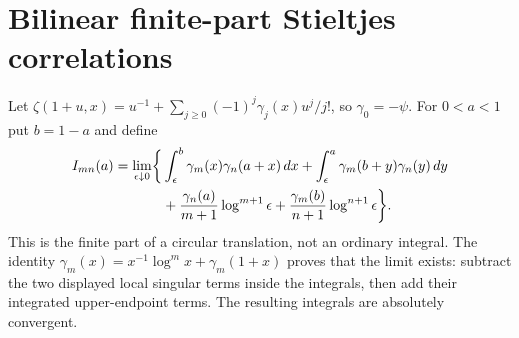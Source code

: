 \providecommand{\corrclosureG}{\mathcal G}
\providecommand{\corrclosureK}{\mathcal K}
\providecommand{\corrclosureA}{\mathcal A_{\mathrm{cc}}}
\providecommand{\corrclosureB}{\mathcal B_{\mathrm{cc}}}
\providecommand{\corrclosureFP}{\operatorname{FP}}
\providecommand{\corrclosureLi}{\operatorname{Li}}
\section{Bilinear finite-part Stieltjes correlations}
\label{corrclosure:sec}

Let $\zeta(1+u,x)=u^{-1}+\sum_{j\ge0}(-1)^j\gamma_j(x)u^j/j!$,
so $\gamma_0=-\psi$. For $0<a<1$ put $b=1-a$ and define
\begin{align}
 I_{mn}(a)=\lim_{\epsilon\downarrow0}\biggl\{
 &\int_\epsilon^b\gamma_m(x)\gamma_n(a+x)\,dx
 +\int_\epsilon^a\gamma_m(b+y)\gamma_n(y)\,dy\notag\\
 &+\frac{\gamma_n(a)}{m+1}\log^{m+1}\epsilon
 +\frac{\gamma_m(b)}{n+1}\log^{n+1}\epsilon\biggr\}.
 \label{corrclosure:definition}
\end{align}
This is the finite part of a circular translation, not an ordinary
integral. The identity
$\gamma_m(x)=x^{-1}\log^m x+\gamma_m(1+x)$ proves that the limit exists:
subtract the two displayed local singular terms inside the integrals,
then add their integrated upper-endpoint terms. The resulting integrals
are absolutely convergent.

